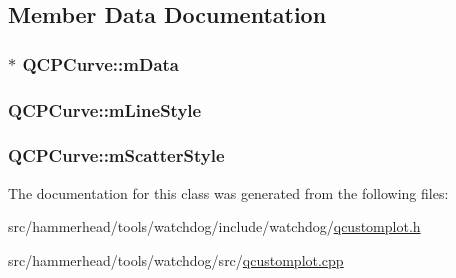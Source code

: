\subsection{Member Data Documentation}
\subsubsection[{\texorpdfstring{m\+Data}{mData}}]{$\ast$ Q\+C\+P\+Curve\+::m\+Data\hspace{0.3cm}{\ttfamily [protected]}}\hypertarget{classQCPCurve_a88d533e455bca96004b049e99168731b}{}\label{classQCPCurve_a88d533e455bca96004b049e99168731b}
\subsubsection[{\texorpdfstring{m\+Line\+Style}{mLineStyle}}]{ Q\+C\+P\+Curve\+::m\+Line\+Style\hspace{0.3cm}{\ttfamily [protected]}}\hypertarget{classQCPCurve_ae1f35ae2b15aee8e15bcdfec5be95156}{}\label{classQCPCurve_ae1f35ae2b15aee8e15bcdfec5be95156}
\subsubsection[{\texorpdfstring{m\+Scatter\+Style}{mScatterStyle}}]{ Q\+C\+P\+Curve\+::m\+Scatter\+Style\hspace{0.3cm}{\ttfamily [protected]}}\hypertarget{classQCPCurve_a08f803b4a30b01bbd7a1eab15d0f864f}{}\label{classQCPCurve_a08f803b4a30b01bbd7a1eab15d0f864f}


The documentation for this class was generated from the following files\+:\begin{DoxyCompactItemize}
\item 
src/hammerhead/tools/watchdog/include/watchdog/\hyperlink{qcustomplot_8h}{qcustomplot.\+h}\item 
src/hammerhead/tools/watchdog/src/\hyperlink{qcustomplot_8cpp}{qcustomplot.\+cpp}\end{DoxyCompactItemize}
